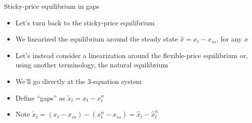 \documentclass[9pt,xcolor={dvipsnames}]{beamer}
\newcommand{\bit}{\begin{itemize}}
\newcommand{\eit}{\end{itemize}}
\newcommand{\bc}{\color{blue}}
\begin{document}
\begin{frame}{Sticky-price equilibrium in gaps}

\bit
\setlength\itemsep{1.5em}
\item Let's turn back to the {\bc sticky-price equilibrium}

\item We linearized the equilibrium around the steady state $\hat x = x_t - x_{ss}$, for any $x$

\item Let's instead consider a linearization around the {\bc flexible-price equilibrium} or, using another terminology, the {\bc natural equilibrium}

\item We'll go directly at the 3-equation system

\item Define ``gaps'' as $\tilde x_t = x_t-x_t^n$

\item Note $\tilde x_t = (x_t-x_{ss})- (x_t^n-x_{ss}) = \hat x_t - \hat x^n_t$


\eit

\end{frame}
\end{document}
